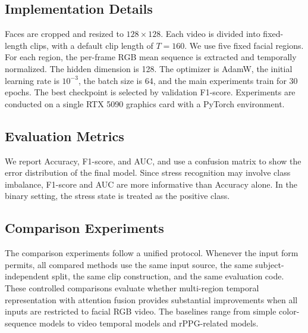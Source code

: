 \documentclass[runningheads]{llncs}
\begin{document}
\subsection{Implementation Details}

Faces are cropped and resized to $128 \times 128$. Each video is divided into fixed-length clips, with a default clip length of $T=160$. We use five fixed facial regions. For each region, the per-frame RGB mean sequence is extracted and temporally normalized. The hidden dimension is 128. The optimizer is AdamW, the initial learning rate is $10^{-3}$, the batch size is 64, and the main experiments train for 30 epochs. The best checkpoint is selected by validation F1-score. Experiments are conducted on a single RTX 5090 graphics card with a PyTorch environment.

\subsection{Evaluation Metrics}

We report Accuracy, F1-score, and AUC, and use a confusion matrix to show the error distribution of the final model. Since stress recognition may involve class imbalance, F1-score and AUC are more informative than Accuracy alone. In the binary setting, the stress state is treated as the positive class.

\subsection{Comparison Experiments}

The comparison experiments follow a unified protocol. Whenever the input form permits, all compared methods use the same input source, the same subject-independent split, the same clip construction, and the same evaluation code. These controlled comparisons evaluate whether multi-region temporal representation with attention fusion provides substantial improvements when all inputs are restricted to facial RGB video. The baselines range from simple color-sequence models to video temporal models and rPPG-related models.
\end{document}
